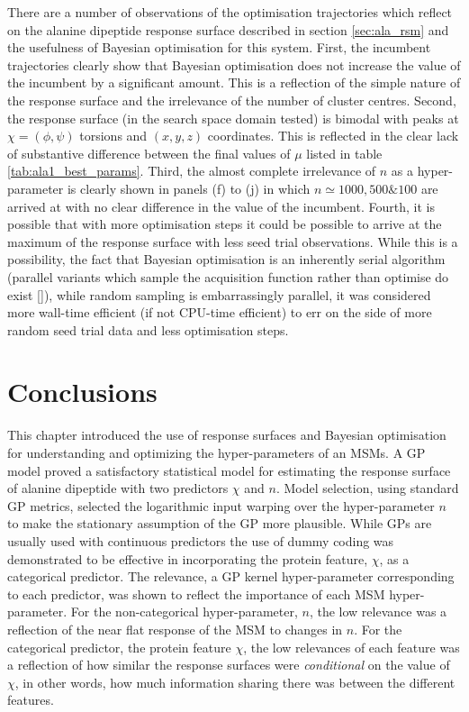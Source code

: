 There are a number of observations of the optimisation trajectories which reflect on the alanine dipeptide response surface described in section \ref{sec:ala_rsm} and the usefulness of Bayesian optimisation for this system. First, the incumbent trajectories clearly show that Bayesian optimisation does not increase the value of the incumbent by a significant amount. This is a reflection of the simple nature of the response surface and the irrelevance of the number of cluster centres. Second, the response surface (in the search space domain tested) is bimodal with peaks at $\chi=(\phi, \psi)$ torsions and $(x, y, z)$ coordinates. This is reflected in the clear lack of substantive difference between the final values of $\mu$ listed in table \ref{tab:ala1_best_params}.  Third, the almost complete irrelevance of $n$ as a hyper-parameter is clearly shown in panels (f) to (j) in which $n \simeq 1000, 500 \& 100$ are arrived at with no clear difference in the value of the incumbent. Fourth, it is possible that with more optimisation steps it could be possible to arrive at the maximum of the response surface with less seed trial observations. While this is a possibility, the fact that Bayesian optimisation is an inherently serial algorithm (parallel variants which sample the acquisition function rather than optimise do exist []), while random sampling is embarrassingly parallel, it was considered more wall-time efficient (if not CPU-time efficient) to err on the side of more random seed trial data and less optimisation steps. 



\section{Conclusions}\label{sec:msm_opt_conc}

This chapter introduced the use of response surfaces and Bayesian optimisation for understanding and optimizing the hyper-parameters of an MSMs. A GP model proved a satisfactory statistical model for estimating the response surface of alanine dipeptide with two predictors $\chi$ and $n$. Model selection, using standard GP metrics, selected the logarithmic input warping over the hyper-parameter $n$ to make the stationary assumption of the GP more plausible.  While GPs are usually used with continuous predictors the use of dummy coding  was demonstrated to be effective in incorporating the protein feature, $\chi$, as a categorical predictor. The relevance, a GP kernel hyper-parameter corresponding to each predictor,  was shown to reflect the importance of each  MSM hyper-parameter. For the non-categorical hyper-parameter, $n$, the low relevance was a reflection of the near flat response of the MSM to changes in $n$. For the categorical predictor, the protein feature $\chi$, the low relevances of each feature was a reflection of how similar the response surfaces were \emph{conditional} on the value of $\chi$, in other words, how much information sharing there was between the different features. 

